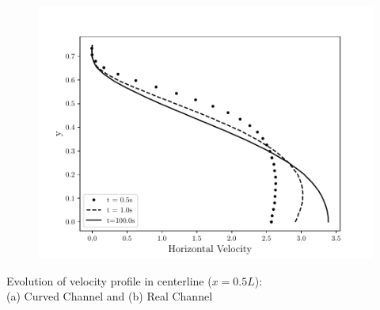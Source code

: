 \begin{frame}
\begin{figure}
\begin{minipage}{.50\linewidth}
      \includegraphics[scale=0.35]{images/vel_RealStrut_evol.pdf}\\
     \end{minipage}
\end{figure}
\vspace{-0.2cm}
\centering \tiny Evolution of velocity profile in centerline ($x=0.5L$):\\
                       (a) Curved Channel and (b) Real Channel
\end{frame}


